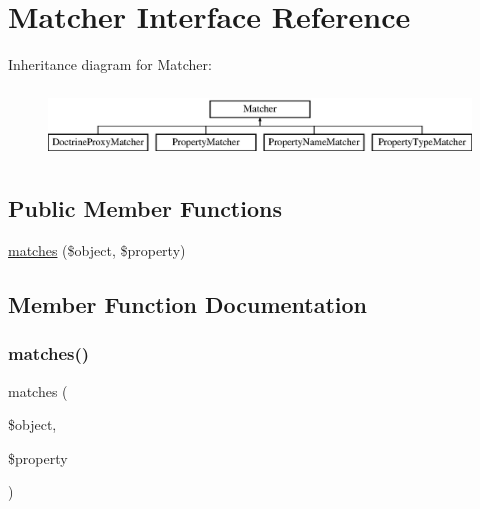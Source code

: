 \hypertarget{interface_deep_copy_1_1_matcher_1_1_matcher}{}\section{Matcher Interface Reference}
\label{interface_deep_copy_1_1_matcher_1_1_matcher}
Inheritance diagram for Matcher\+:\begin{figure}[H]
\begin{center}
\leavevmode
\includegraphics[height=1.891892cm]{interface_deep_copy_1_1_matcher_1_1_matcher}
\end{center}
\end{figure}
\subsection*{Public Member Functions}
\begin{DoxyCompactItemize}
\item 
\mbox{\hyperlink{interface_deep_copy_1_1_matcher_1_1_matcher_a2e9fdbe8d1a508d5c5ee7c81d27d77ea}{matches}} (\$object, \$property)
\end{DoxyCompactItemize}


\subsection{Member Function Documentation}
\mbox{\label{interface_deep_copy_1_1_matcher_1_1_matcher_a2e9fdbe8d1a508d5c5ee7c81d27d77ea}} 
\subsubsection{\texorpdfstring{matches()}{matches()}}
{\footnotesize\ttfamily matches (\begin{DoxyParamCaption}\item[{}]{\$object,  }\item[{}]{\$property }\end{DoxyParamCaption})}


